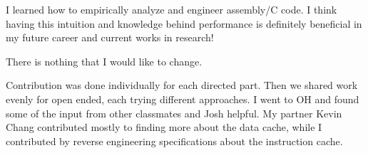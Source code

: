 \documentclass[11pt]{article}
\begin{document}
I learned how to empirically analyze and engineer assembly/C code. I think having this intuition and knowledge behind performance is definitely beneficial in my future career and current works in research!

There is nothing that I would like to change.

Contribution was done individually for each directed part. Then we shared work evenly for open ended, each trying different approaches. I went to OH and found some of the input from other classmates and Josh helpful.
My partner Kevin Chang contributed mostly to finding more about the data cache, while I contributed by reverse engineering specifications about the instruction cache.
\end{document}
